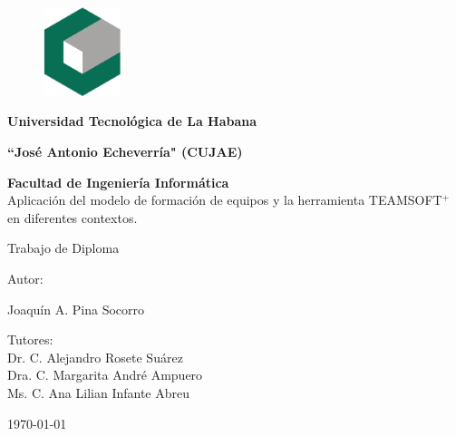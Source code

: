 \begin{figure}
	\centering
	\includegraphics[width=0.2\textwidth]{figuras/cujae.eps}
\end{figure}
\vspace{3cm}	
\begin{center}
	\Large{\textbf{Universidad Tecnológica de La Habana}}
	
	\Large{\textbf{“José Antonio Echeverría" (CUJAE)}}
	
	\Large{\textbf{
			Facultad de Ingeniería Informática}}\\
	
	\vspace{1.3cm}
	\Large{Aplicación del modelo de formación de equipos y la herramienta TEAMSOFT$^+$ en diferentes contextos.}
	\vspace{1cm}
	
	\normalsize
	{\Large		
	Trabajo de Diploma
	}
	\vspace{1cm}
	
	Autor: 
	
	Joaquín A. Pina Socorro
	\vspace{0.5cm}
	
	Tutores:\\
	Dr. C. Alejandro Rosete Suárez\\
	Dra. C. Margarita André Ampuero\\
	Ms. C. Ana Lilian Infante Abreu
	
	
	\vspace{2cm}
	
	\small{\mifecha\today}
	
\end{center}	


